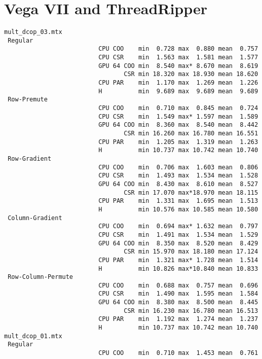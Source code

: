 \newpage
\twocolumn
\section{Vega VII and ThreadRipper}
\label{sec:vega}
{\tiny

\begin{verbatim}
mult_dcop_03.mtx
 Regular
                          CPU COO    min  0.728 max  0.880 mean  0.757
                          CPU CSR    min  1.563 max  1.581 mean  1.577
                          GPU 64 COO min  8.540 max* 8.670 mean  8.619
                                 CSR min 18.320 max 18.930 mean 18.620
                          CPU PAR    min  1.170 max  1.269 mean  1.226
                          H          min  9.689 max  9.689 mean  9.689
 Row-Premute
                          CPU COO    min  0.710 max  0.845 mean  0.724
                          CPU CSR    min  1.549 max* 1.597 mean  1.589
                          GPU 64 COO min  8.360 max  8.540 mean  8.442
                                 CSR min 16.260 max 16.780 mean 16.551
                          CPU PAR    min  1.205 max  1.319 mean  1.263
                          H          min 10.737 max 10.742 mean 10.740
 Row-Gradient
                          CPU COO    min  0.706 max  1.603 mean  0.806
                          CPU CSR    min  1.493 max  1.534 mean  1.528
                          GPU 64 COO min  8.430 max  8.610 mean  8.527
                                 CSR min 17.070 max*18.970 mean 18.115
                          CPU PAR    min  1.331 max  1.695 mean  1.513
                          H          min 10.576 max 10.585 mean 10.580
 Column-Gradient
                          CPU COO    min  0.694 max* 1.632 mean  0.797
                          CPU CSR    min  1.491 max  1.534 mean  1.529
                          GPU 64 COO min  8.350 max  8.520 mean  8.429
                                 CSR min 15.970 max 18.180 mean 17.124
                          CPU PAR    min  1.321 max* 1.728 mean  1.514
                          H          min 10.826 max*10.840 mean 10.833
 Row-Column-Permute
                          CPU COO    min  0.688 max  0.757 mean  0.696
                          CPU CSR    min  1.490 max  1.595 mean  1.584
                          GPU 64 COO min  8.380 max  8.500 mean  8.445
                                 CSR min 16.230 max 16.780 mean 16.513
                          CPU PAR    min  1.192 max  1.274 mean  1.237
                          H          min 10.737 max 10.742 mean 10.740
mult_dcop_01.mtx
 Regular
                          CPU COO    min  0.710 max  1.453 mean  0.761

\end{verbatim}}
